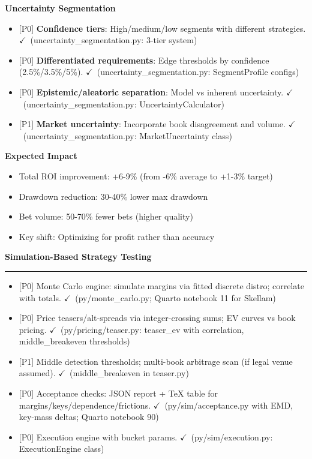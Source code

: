 \documentclass[11pt]{article}
\newcommand{\block}[1]{\par\noindent\textbf{#1}\par\vspace{0.25em}}
\newcommand{\milestone}[1]{\vspace{0.5em}\noindent\textbf{\large #1}\par\vspace{0.25em}\hrule\vspace{0.5em}}
\newcommand{\done}{\textcolor{green!60!black}{\(\checkmark\)}}
\newcommand{\prio}[1]{\textcolor{blue!70!black}{[#1]}}
\begin{document}
\begin{itemize}
\block{Uncertainty Segmentation}
\begin{itemize}
  \item \prio{P0} \textbf{Confidence tiers}: High/medium/low segments with different strategies. \done\ (uncertainty\_segmentation.py: 3-tier system)
  \item \prio{P0} \textbf{Differentiated requirements}: Edge thresholds by confidence (2.5\%/3.5\%/5\%). \done\ (uncertainty\_segmentation.py: SegmentProfile configs)
  \item \prio{P0} \textbf{Epistemic/aleatoric separation}: Model vs inherent uncertainty. \done\ (uncertainty\_segmentation.py: UncertaintyCalculator)
  \item \prio{P1} \textbf{Market uncertainty}: Incorporate book disagreement and volume. \done\ (uncertainty\_segmentation.py: MarketUncertainty class)
\end{itemize}

\block{Expected Impact}
\begin{itemize}
  \item Total ROI improvement: +6-9\% (from -6\% average to +1-3\% target)
  \item Drawdown reduction: 30-40\% lower max drawdown
  \item Bet volume: 50-70\% fewer bets (higher quality)
  \item Key shift: Optimizing for profit rather than accuracy
\end{itemize}

\milestone{Simulation-Based Strategy Testing}
\begin{itemize}
  \item \prio{P0} Monte Carlo engine: simulate margins via fitted discrete distro; correlate with totals. \done\ (py/monte\_carlo.py; Quarto notebook 11 for Skellam)
  \item \prio{P0} Price teasers/alt-spreads via integer-crossing sums; EV curves vs book pricing. \done\ (py/pricing/teaser.py: teaser\_ev with correlation, middle\_breakeven thresholds)
  \item \prio{P1} Middle detection thresholds; multi-book arbitrage scan (if legal venue assumed). \done\ (middle\_breakeven in teaser.py)
  \item \prio{P0} Acceptance checks: JSON report + TeX table for margins/keys/dependence/frictions. \done\ (py/sim/acceptance.py with EMD, key-mass deltas; Quarto notebook 90)
  \item \prio{P0} Execution engine with bucket params. \done\ (py/sim/execution.py: ExecutionEngine class)
\end{itemize}


\end{itemize}
\end{document}
